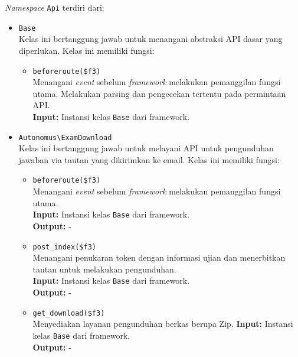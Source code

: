     \textit{Namespace} \texttt{Api} terdiri dari:
    \begin{itemize}
        \item \texttt{Base} \\
            Kelas ini bertanggung jawab untuk menangani abstraksi API dasar yang
            diperlukan. Kelas ini memiliki fungsi:
            \begin{itemize}
                \item \texttt{beforeroute(\$f3)} \\
                    Menangani \textit{event} sebelum \textit{framework}
                    melakukan pemanggilan fungsi utama. Melakukan parsing dan
                    pengecekan tertentu pada permintaan API.\\
                    \textbf{Input:} Instansi kelas \texttt{Base} dari
                    framework.\\
            \end{itemize}
    
        \item \texttt{Autonomus\textbackslash ExamDownload} \\
            Kelas ini bertanggung jawab untuk melayani API untuk pengunduhan
            jawaban via tautan yang dikirimkan ke email. Kelas ini memiliki
            fungsi:
            \begin{itemize}
                \item \texttt{beforeroute(\$f3)} \\
                    Menangani \textit{event} sebelum \textit{framework}
                    melakukan pemanggilan fungsi utama.\\
                    \textbf{Input:} Instansi kelas \texttt{Base} dari
                    framework.\\
                    \textbf{Output:} -
                
                \item \texttt{post\_index(\$f3)} \\
                    Menangani penukaran token dengan informasi ujian dan
                    menerbitkan tautan untuk melakukan pengunduhan.\\
                    \textbf{Input:} Instansi kelas \texttt{Base} dari
                    framework.\\
                    \textbf{Output:} -
                
                \item \texttt{get\_download(\$f3)} \\
                    Menyediakan layanan pengunduhan berkas berupa Zip.
                    \textbf{Input:} Instansi kelas \texttt{Base} dari
                    framework.\\
                    \textbf{Output:} -
            \end{itemize}
            

\end{itemize}
